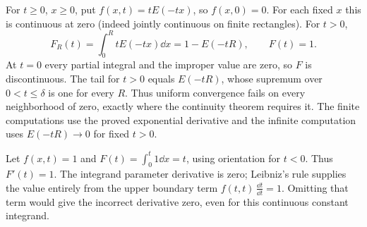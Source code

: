 \begin{example}
For $t\ge0$, $x\ge0$, put $f(x,t)=tE(-tx)$, so $f(x,0)=0$.
For each fixed $x$ this is continuous at zero (indeed jointly continuous
on finite rectangles). For $t>0$,
\[F_R(t)=\int_0^RtE(-tx)\dd x=1-E(-tR),\qquad
F(t)=1.
\]
At $t=0$ every partial integral and the improper value are zero, so $F$
is discontinuous. The tail for $t>0$ equals $E(-tR)$, whose supremum
over $0<t\le\delta$ is one for every $R$. Thus uniform convergence
fails on every neighborhood of zero, exactly where the continuity
theorem requires it. The finite computations use the proved exponential
derivative and the infinite computation uses $E(-tR)\to0$ for fixed $t>0$.
\end{example}

\begin{example}
Let $f(x,t)=1$ and $F(t)=\int_0^t1\dd x=t$, using orientation for
$t<0$. Thus $F'(t)=1$. The integrand parameter derivative is zero;
Leibniz's rule supplies the value entirely from the upper boundary term
$f(t,t)\,\frac{\dd t}{\dd t}=1$. Omitting that term would give the
incorrect derivative zero, even for this continuous constant integrand.
\end{example}
